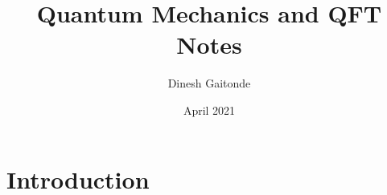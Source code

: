 \documentclass{article}
\title{Quantum Mechanics and  QFT Notes}
\author{Dinesh Gaitonde}
\date{April 2021}
\begin{document}
\maketitle

\section{Introduction}
\end{document}
